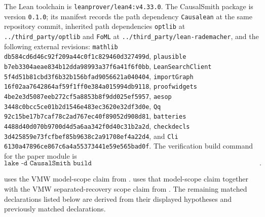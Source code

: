 \documentclass[11pt]{article}
\begin{document}
The Lean toolchain is \texttt{leanprover/lean4:v4.33.0}. The CausalSmith package is version \texttt{0.1.0}; its manifest records the path dependency \texttt{Causalean} at the same repository commit, inherited path dependencies \texttt{optlib} at \texttt{../third\_party/optlib} and \texttt{FoML} at \texttt{../third\_party/lean-rademacher}, and the following external revisions: \texttt{mathlib} \texttt{db584cd6d46c92f209a44c0f1c829460d327499d}, \texttt{plausible} \texttt{b7eb3304aeae834b12dda98993a37f6a41f6f0bb}, \texttt{LeanSearchClient} \texttt{5f4d51b81cbd3f6b32b156bfad9056621a040404}, \texttt{importGraph} \texttt{16f02aa7642864af59f1ff0e384a015994db9118}, \texttt{proofwidgets} \texttt{4be2e3d5087eeb272cf5a8853b8f9dd025ef5957}, \texttt{aesop} \texttt{3448c0bcc5ce01b2d1546e483ec3620e32df3d0e}, \texttt{Qq} \texttt{92c15be17b7caf78c2ad767ec40f89052d908d81}, \texttt{batteries} \texttt{4488d40d070b9700d4d5a6aa342f0d40c31b2a2d}, \texttt{checkdecls} \texttt{3d425859e73fcfbef85b9638c2a91708ef4a22d4}, and \texttt{Cli} \texttt{6130a47896ce867c6a4a55373441e59e565bad0f}. The verification build command for the paper module is
\[
\texttt{lake -d CausalSmith build CausalSmith.Stat.STAT\_ProxyEffectlawEigencollisionFrontier\_Research}.
\]

 uses the VMW model-scope claim from \citep[Assumptions 1--2 and Section 4.2]{VirkMazaheriWu2026}.  uses that model-scope claim together with the VMW separated-recovery scope claim from \citep[Assumption 3, Assumption 4, and Theorem 7.2]{VirkMazaheriWu2026}. The remaining matched declarations listed below are derived from their displayed hypotheses and previously matched declarations.
\end{document}

